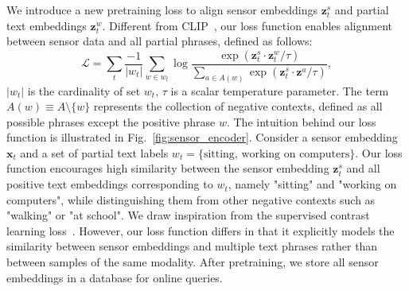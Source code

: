 %
We introduce a new pretraining loss to align sensor embeddings $\mathbf{z}^s_t$ and partial text embeddings $\mathbf{z}^w_t$. Different from CLIP~\cite{radford2021learning}, our loss function enables alignment between sensor data and all partial phrases, defined as follows:
\begin{equation}
 \mathcal{L} = \sum_t {\frac{-1}{|w_t|} \sum_{w \in w_t} \log \frac{\exp(\mathbf{z}^s_t \cdot \mathbf{z}^w_t / \tau)}{\sum_{a \in A(w)} \exp (\mathbf{z}^s_t \cdot \mathbf{z}^a / \tau)}}, \label{eq:loss} 
\end{equation}
$|w_t|$ is the cardinality of set $w_t$, $\tau$ is a scalar temperature parameter. The term $A(w) \equiv A \setminus \{w\}$ represents the collection of negative contexts, defined as all possible phrases except the positive phrase $w$.
The intuition behind our loss function is illustrated in Fig.~\ref{fig:sensor_encoder}. Consider a sensor embedding $\mathbf{x}_t$ and a set of partial text labels $w_t = \{ \textrm{sitting, working on computers}\}$.
Our loss function encourages high similarity between the sensor embedding $\mathbf{z}^s_t$ and all positive text embeddings corresponding to $w_t$, namely "sitting" and "working on computers", while distinguishing them from other negative contexts such as "walking" or "at school". We draw inspiration from the supervised contrast learning loss~\cite{khosla2020supervised}. However, our loss function differs in that it explicitly models the similarity between sensor embeddings and multiple text phrases rather than between samples of the same modality.
After pretraining, we store all sensor embeddings in a database for online queries.

